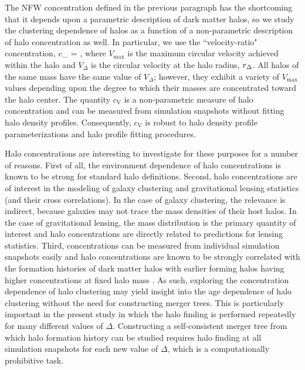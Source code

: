 \documentclass[usenatbib,fleqn]{mnras}
\begin{document}
The NFW concentration defined in the previous paragraph has the shortcoming that it 
depends upon a parametric description of dark matter halos, so we study the clustering dependence 
of halos as a function of a non-parametric description of halo concentration as well. In particular, we 
use the ``velocity-ratio" concentration,
\beq
c_{} = , 
\eeq
where $V_{\mathrm{max}}$ is the maximum circular velocity achieved within the halo and $V_{\Delta}$ is 
the circular velocity at the halo radius, $r_{\Delta}$. All halos of the same mass have the same value of $V_{\Delta}$; however, 
they exhibit a variety of $V_{\mathrm{max}}$ values depending upon the degree to which their masses are concentrated toward 
the halo center. The quantity $c_{\mathrm{V}}$ is a non-parametric measure of halo concentration and can be measured from 
simulation snapshots without fitting halo density profiles. Consequently, $c_{\mathrm{V}}$ is robust to halo density 
profile parameterizations and halo profile fitting procedures. 


Halo concentrations are interesting to investigate for these purposes for a number of reasons. 
First of all, the environment dependence of halo concentrations is known to be strong for 
standard halo definitions. Second, halo concentrations are of interest in the modeling of 
galaxy clustering and gravitational lensing statistics (and their cross correlations). 
In the case of galaxy clustering, the relevance is indirect, because galaxies may 
not trace the mass densities of their host halos. In the case 
of gravitational lensing, the mass distribution is the primary quantity of interest and halo concentrations are 
directly related to predictions for lensing statistics. Third, concentrations can be measured from 
individual simulation snapshots easily and halo concentrations are known to be strongly correlated with 
the formation histories of dark matter halos with earlier forming halos having higher concentrations at 
fixed halo mass \citep{wechsler_etal02, zhao_etal03, wechsler_etal06, zhao_etal09}. 
As such, exploring the concentration dependence of halo
clustering may yield insight into the age dependence of halo clustering without the need for constructing merger
trees. This is particularly important in the present study in which the halo finding is performed repeatedly for many 
different values of $\Delta$. Constructing a self-consistent merger tree from which halo formation history can be 
studied requires halo finding at all simulation snapshots for each new value of $\Delta$, which is a computationally 
prohibitive task. 
\end{document}
